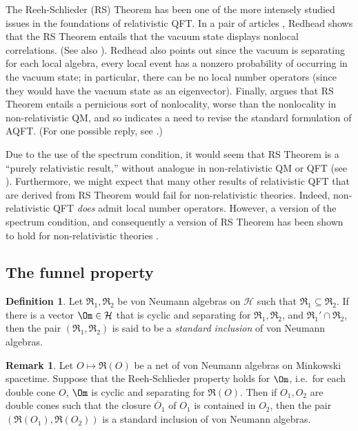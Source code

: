\documentclass[12pt]{article}
\newcommand{\alg}[1]{\mathfrak{#1}}
\theoremstyle{definition}
\theoremstyle{definition}
\newtheorem{defn}[thm]{Definition}
\newtheorem{note}[thm]{Remark}
\theoremstyle{remark}
\def\2#1{{\mathcal #1}}
\def\ol#1{{\overline #1}}
\def\al#1{{\mathfrak #1}}
\begin{document}
The Reeh-Schlieder (RS) Theorem has been one of the
more intensely studied issues in the foundations of
relativistic QFT.  In a pair of articles
\cite{red1,red2}, Redhead shows that the RS Theorem entails
that the vacuum state displays nonlocal
correlations. (See also \cite{gbell}).  Redhead also
points out since the vacuum is separating for each
local algebra, every local event has a nonzero
probability of occurring in the vacuum state; in
particular, there can be no local number operators
(since they would have the vacuum state as an
eigenvector).  Finally, \cite{flem} argues that RS Theorem
entails a pernicious sort of nonlocality, worse than
the nonlocality in non-relativistic QM, and so
indicates a need to revise the standard formulation of
AQFT.  (For one possible reply, see \cite{me}.)

Due to the use of the spectrum condition, it would seem
that RS Theorem is a ``purely relativistic result,''
without analogue in non-relativistic QM or QFT (see
\cite{saund}).  Furthermore, we might expect that many
other results of relativistic QFT that are derived from
RS Theorem would fail for non-relativistic theories.
Indeed, non-relativistic QFT \emph{does} admit local
number operators.  However, a version of the spectrum
condition, and consequently a version of RS Theorem has
been shown to hold for non-relativistic theories
\cite{req}.

\bigskip {}

\subsection{The funnel property}

\begin{defn} Let $\al R_1,\al R_2$ be von Neumann
  algebras on $\2H$ such that $\al R_1\subseteq \al
  R_2$.  If there is a vector $\Om \in \2H$ that is
  cyclic and separating for $\al R_1,\al R_2$, and $\al
  R_1'\cap \al R_2$, then the pair $(\al R_1,\al R_2)$
  is said to be a \emph{standard inclusion} of von
  Neumann algebras.  \end{defn}

\begin{note} Let $O\mapsto \al R(O)$ be a net of von
  Neumann algebras on Minkowski spacetime.  Suppose
  that the Reeh-Schlieder property holds for $\Om$,
  i.e.\ for each double cone $O$, $\Om$ is cyclic and
  separating for $\al R(O)$.  Then if $O_1,O_2$ are
  double cones such that the closure $\ol{O}_1$ of
  $O_1$ is contained in $O_2$, then the pair
  $(\alg{R}(O_1),\alg{R}(O_2))$ is a standard inclusion
  of von Neumann algebras.  \end{note}
\end{document}
